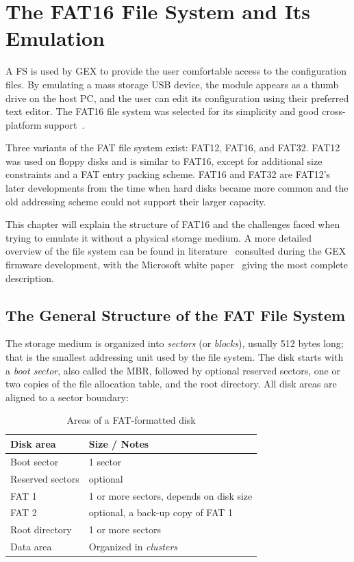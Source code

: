 \chapter{The FAT16 File System and Its Emulation} \label{sec:fat16}

A \gls{FS} is used by GEX to provide the user comfortable access to the configuration files. By emulating a mass storage \gls{USB} device, the module appears as a thumb drive on the host \gls{PC}, and the user can edit its configuration using their preferred text editor. The FAT16 file system was selected for its simplicity and good cross-platform support~\cite{os-support-table}.

Three variants of the \gls{FAT} file system exist: FAT12, FAT16, and FAT32. FAT12 was used on floppy disks and is similar to FAT16, except for additional size constraints and a \gls{FAT} entry packing scheme. FAT16 and FAT32 are FAT12's later developments from the time when hard disks became more common and the old addressing scheme could not support their larger capacity.

This chapter will explain the structure of FAT16 and the challenges faced when trying to emulate it without a physical storage medium. A more detailed overview of the file system can be found in literature~\cite{ms-fat,fat16-brainy,fat16-maverick,fat16-phobos,fat-whitepaper} consulted during the GEX firmware development, with the Microsoft white paper~\cite{fat-whitepaper} giving the most complete description.

\section{The General Structure of the FAT File System}

The storage medium is organized into \textit{sectors} (or \textit{blocks}), usually 512 bytes long; that is the smallest addressing unit used by the file system. The disk starts with a \textit{boot sector}, also called the \gls{MBR}, followed by optional reserved sectors, one or two copies of the file allocation table, and the root directory. All disk areas are aligned to a sector boundary:

\begin{table}[H]
	\centering
	\begin{tabular}{ll}
		\toprule
		\textbf{Disk area} & \textbf{Size / Notes} \\
		\midrule
		Boot sector & 1 sector \\
		Reserved sectors & optional \\
		FAT 1 & 1 or more sectors, depends on disk size \\
		FAT 2 & optional, a back-up copy of FAT 1 \\
		Root directory & 1 or more sectors \\
		Data area & Organized in \textit{clusters} \\
		\bottomrule
	\end{tabular}
	\caption{\label{tab:fat16_disk_areas}Areas of a FAT-formatted disk}
\end{table}

